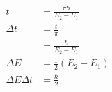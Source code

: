 \documentclass{article}
\begin{document}
\begin{align*}
  t                      & = \frac{\pi \hbar}{E_2 - E_1}                                                                                                                                                       \\
  \Delta t               & = \frac{t}{\pi}                                                                                                                                                                     \\
                         & = \frac{\hbar}{E_2 - E_1}                                                                                                                                                           \\
  \Delta E               & = \frac{1}{2} (E_2 - E_1)                                                                                                                                                           \\
  \Delta E \Delta t      & = \frac{\hbar}{2}
\end{align*}

\setcounter{subsection}{40}
\subsection{}
\end{document}
